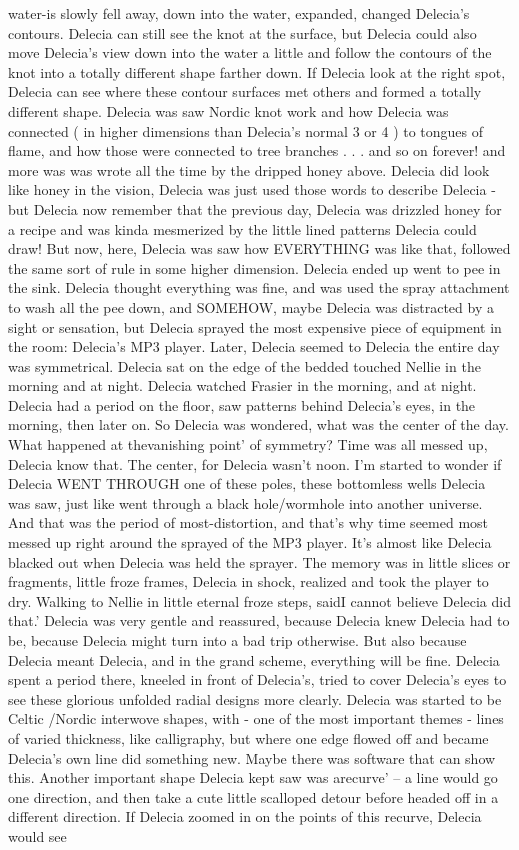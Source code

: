 \documentclass[12pt]{book}
\begin{document}
water-is slowly fell away, down into the water, expanded, changed Delecia's contours. Delecia can still see the knot at the surface, but Delecia could also move Delecia's view down into the water a little and follow the contours of the knot into a totally different shape farther down. If Delecia look at the right spot, Delecia can see where these contour surfaces met others and formed a totally different shape. Delecia was saw Nordic knot work and how Delecia was connected ( in higher dimensions than Delecia's normal 3 or 4 ) to tongues of flame, and how those were connected to tree branches . . .  and so on forever! and more was was wrote all the time by the dripped honey above. Delecia did look like honey in the vision, Delecia was just used those words to describe Delecia - but Delecia now remember that the previous day, Delecia was drizzled honey for a recipe and was kinda mesmerized by the little lined patterns Delecia could draw! But now, here, Delecia was saw how EVERYTHING was like that, followed the same sort of rule in some higher dimension. Delecia ended up went to pee in the sink. Delecia thought everything was fine, and was used the spray attachment to wash all the pee down, and SOMEHOW, maybe Delecia was distracted by a sight or sensation, but Delecia sprayed the most expensive piece of equipment in the room: Delecia's MP3 player. Later, Delecia seemed to Delecia the entire day was symmetrical. Delecia sat on the edge of the bedded touched Nellie in the morning and at night. Delecia watched Frasier in the morning, and at night. Delecia had a period on the floor, saw patterns behind Delecia's eyes, in the morning, then later on. So Delecia was wondered, what was the center of the day. What happened at thevanishing point' of symmetry? Time was all messed up, Delecia know that. The center, for Delecia wasn't noon. I'm started to wonder if Delecia WENT THROUGH one of these poles, these bottomless wells Delecia was saw, just like went through a black hole/wormhole into another universe. And that was the period of most-distortion, and that's why time seemed most messed up right around the sprayed of the MP3 player. It's almost like Delecia blacked out when Delecia was held the sprayer. The memory was in little slices or fragments, little froze frames, Delecia in shock, realized and took the player to dry. Walking to Nellie in little eternal froze steps, saidI cannot believe Delecia did that.' Delecia was very gentle and reassured, because Delecia knew Delecia had to be, because Delecia might turn into a bad trip otherwise. But also because Delecia meant Delecia, and in the grand scheme, everything will be fine. Delecia spent a period there, kneeled in front of Delecia's, tried to cover Delecia's eyes to see these glorious unfolded radial designs more clearly. Delecia was started to be Celtic /Nordic interwove shapes, with - one of the most important themes - lines of varied thickness, like calligraphy, but where one edge flowed off and became Delecia's own line did something new. Maybe there was software that can show this. Another important shape Delecia kept saw was arecurve' -- a line would go one direction, and then take a cute little scalloped detour before headed off in a different direction. If Delecia zoomed in on the points of this recurve, Delecia would see 
\end{document}
